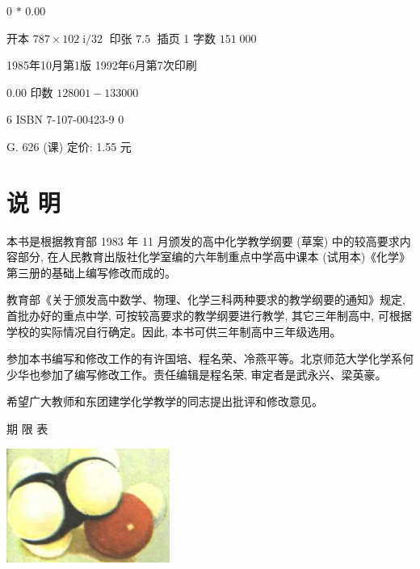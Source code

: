 \documentclass[10pt]{article}
\begin{document}
0 \(*\) 0.00

开本 \({787} \times {102}\;\mathrm{i}/{32}\;\) 印张 \({7.5}\;\) 插页 1 字数 \({151}\;{000}\)

1985年10月第1版 1992年6月第7次印刷

0.00 印数 \({128001} - {133000}\)

6 ISBN 7-107-00423-9 0

G. 626 (课) 定价: 1.55 元

\section*{说 明}

本书是根据教育部 1983 年 11 月颁发的高中化学教学纲要 (草案) 中的较高要求内容部分, 在人民教育出版社化学室编的六年制重点中学高中课本 (试用本)《化学》第三册的基础上编写修改而成的。

教育部《关于颁发高中数学、物理、化学三科两种要求的教学纲要的通知》规定, 首批办好的重点中学, 可按较高要求的教学纲要进行教学, 其它三年制高中, 可根据学校的实际情况自行确定。因此, 本书可供三年制高中三年级选用。

参加本书编写和修改工作的有许国培、程名荣、冷燕平等。北京师范大学化学系何少华也参加了编写修改工作。责任编辑是程名荣, 审定者是武永兴、梁英豪。

希望广大教师和东团建学化学教学的同志提出批评和修改意见。

期 限 表

\begin{center}
\includegraphics[max width=0.4\textwidth]{images/01912d16-be99-77bb-9535-4f3ed8d9946f_4_899350.jpg}
\end{center}
\end{document}
